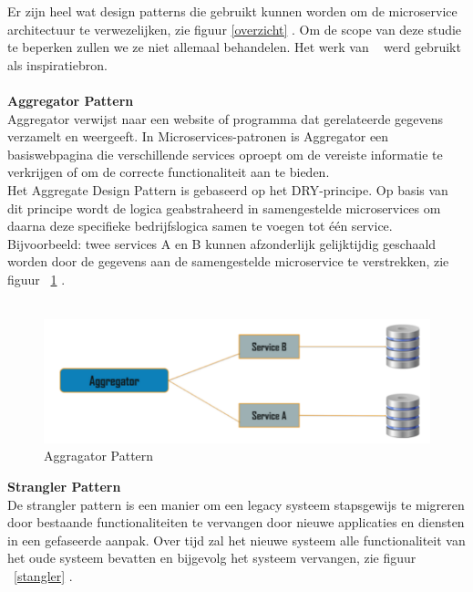 Er zijn heel wat design patterns die gebruikt kunnen worden om de microservice architectuur te verwezelijken, zie figuur \ref{overzicht} . Om de scope van deze studie te beperken zullen we ze niet allemaal behandelen. Het werk van ~\autocite{Richardson2021} werd gebruikt als inspiratiebron.\\ \\
\textbf{Aggregator Pattern}\\
Aggregator verwijst naar een website of programma dat gerelateerde gegevens verzamelt en weergeeft. In Microservices-patronen is Aggregator een basiswebpagina die verschillende services oproept om de vereiste informatie te verkrijgen of om de correcte functionaliteit aan te bieden.\\
Het Aggregate Design Pattern is gebaseerd op het DRY-principe. Op basis van dit principe wordt de logica geabstraheerd in samengestelde microservices om daarna deze specifieke bedrijfslogica samen te voegen tot één service. ~\autocite{Kappaggantula2020} \\
Bijvoorbeeld: twee services A en B kunnen afzonderlijk gelijktijdig geschaald worden door de gegevens aan de samengestelde microservice te verstrekken, zie figuur ~\ref{aggragator} . \\ \\

\begin{figure}[!htb]
    \centering
    \includegraphics[width=1\textwidth]{Aggregator.png}
    \caption{Aggragator Pattern \label{aggragator}}
\end{figure}

\textbf{Strangler Pattern}\\
De strangler pattern is een manier om een legacy systeem stapsgewijs te migreren door bestaande functionaliteiten te vervangen door nieuwe applicaties en diensten in een gefaseerde aanpak. Over tijd zal het nieuwe systeem alle functionaliteit van het oude systeem bevatten en bijgevolg het systeem vervangen, zie figuur ~\ref{stangler} .

